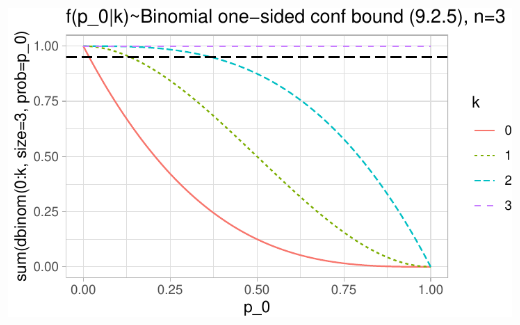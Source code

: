 \documentclass[11pt,]{article}
\begin{document}
\begin{center}\includegraphics[width=1\linewidth]{class_notes_files/figure-latex/unnamed-chunk-6-1} \end{center}
\end{document}
